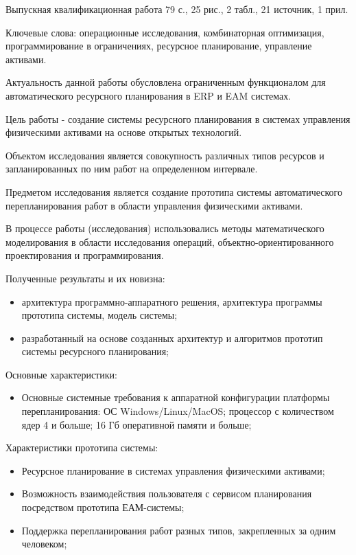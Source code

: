 
Выпускная квалификационная работа 79 с., 25 рис., 2 табл., 21 источник, 1 прил.

Ключевые слова: операционные исследования, комбинаторная оптимизация, программирование в ограничениях, ресурсное планирование, управление активами.

Актуальность данной работы обусловлена ограниченным функционалом для автоматического ресурсного планирования в ERP и EAM системах.

Цель работы - создание системы ресурсного планирования в системах управления физическими активами на основе открытых технологий.

Объектом исследования является совокупность различных типов ресурсов и запланированных по ним работ на определенном интервале.

Предметом исследования является создание прототипа системы автоматического перепланирования работ в области управления физическими активами.

В процессе работы (исследования) использовались методы математического моделирования в области исследования операций, объектно-ориентированного проектирования и программирования.

Полученные результаты и их новизна:

\begin{itemize}
    \item архитектура программно-аппаратного решения, архитектура программы прототипа системы, модель системы;
    \item разработанный на основе созданных архитектур и алгоритмов прототип системы ресурсного планирования;
\end{itemize}

Основные характеристики:

\begin{itemize}
    \item Основные системные требования к аппаратной конфигурации платформы перепланирования: ОС Windows/Linux/MacOS; процессор с количеством ядер 4 и больше; 16 Гб оперативной памяти и больше;
\end{itemize}

Характеристики прототипа системы:
\begin{itemize}
    \item Ресурсное планирование в системах управления физическими активами;
    \item Возможность взаимодействия пользователя с сервисом планирования посредством прототипа ЕАМ-системы;
    \item Поддержка перепланирования работ разных типов, закрепленных за одним человеком;
\end{itemize}


